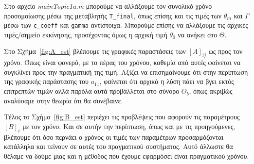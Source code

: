 \documentclass[12pt]{article} %
\numberwithin{equation}{section}  %
\begin{document}
Στο αρχείο \textit{mainTopic1a.m} μπορούμε να αλλάξουμε τον συνολικό χρόνο προσομοίωσης μέσω της μεταβλητής {\small \texttt{T\_final}},
όπως επίσης και τις τιμές των $\theta_m$ και $\Gamma$ μέσω των {\small\texttt{c\_coeff}} και {\small \texttt{gamma}} αντίστοιχα. 
Μπορούμε επίσης να αλλάξουμε τις αρχικές τιμές/σημείο εκκίνησης, προσέχοντας όμως η αρχική τιμή $\theta_0$ να ανήκει στο $\Theta$.

Στο Σχήμα~\ref{fig:A_est} βλέπουμε τις γραφικές παραστάσεις των $[A]_{ij}$ ως προς τον χρόνο. 
Όπως είναι φανερό, με το πέρας του χρόνου, καθεμία από αυτές φαίνεται να συγκλίνει προς την πραγματική της τιμή.
Αξίζει να επισημαίνουμε ότι στην περίπτωση της γραφικής παράστασης του $a_{11}$, φαίνεται ότι αρχικά η λύση πάει να βγει εκτός επιτρεπτών τιμών 
αλλά παρόλα αυτά προβάλλεται στο σύνορο $\Theta_b$, όπως ακριβώς αναλύσαμε στην θεωρία ότι θα συνέβαινε. 

Τέλος το Σχήμα~\ref{fig:B_est} περιέχει τις προβλέψεις που αφορούν τις παραμέτρους $[B]_{i}$ με τον χρόνο. 
Και σε αυτήν την περίπτωση, όπως και με τις προηγούμενες, βλέπουμε ότι όσο περνάει ο χρόνος οι τιμές των παραμέτρων προσαρμόζονται κατάλληλα και τείνουν σε αυτές του πραγματικού συστήματος. 
Αυτό άλλωστε θα θέλαμε να δούμε μιας και η μέθοδος που έχουμε εφαρμόσει είναι πραγματικού χρόνου.
\end{document}
